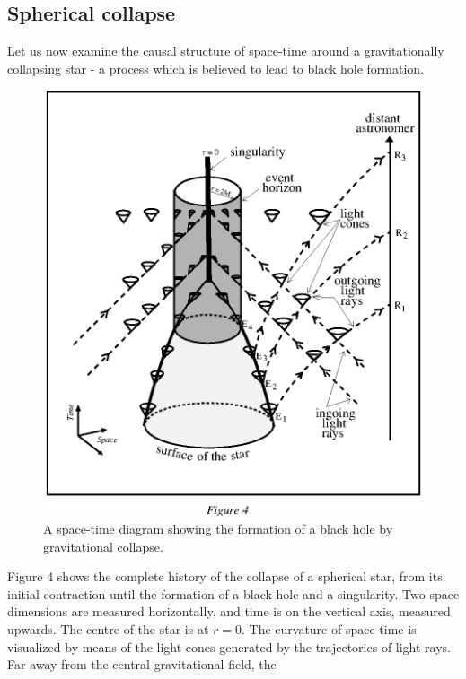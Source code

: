 \documentclass[12pt]{article}
\begin{document}
\subsection {Spherical collapse}

Let us now
examine the causal structure of space-time around a gravitationally collapsing
star - a process which is believed to lead to black hole formation. 
\begin{figure}[tb]
  \begin{center}
    \leavevmode
    \includegraphics{schw.ps}
    \caption{A space-time diagram showing the formation of a black hole by
      gravitational collapse.}
  \end{center}
\end{figure}
Figure 4 shows the complete history of the collapse of a spherical 
star, from
its initial contraction until the formation of a black hole and a singularity.
Two
space dimensions are measured horizontally, and time is on the vertical axis,
measured upwards. The centre of the star is at $r=0$.  The curvature of
space-time is visualized by means of the light cones generated by the
trajectories of light rays. Far away from the central gravitational field, the
\end{document}
